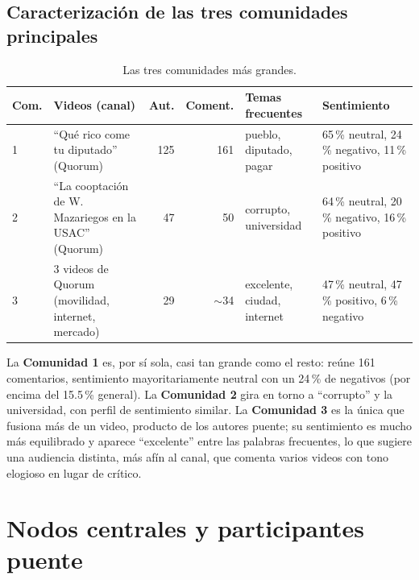 \documentclass[11pt,a4paper]{article}
\begin{document}
\subsection{Caracterizaci\'on de las tres comunidades principales}
\begin{table}[H]
\centering
\caption{Las tres comunidades m\'as grandes.}
\small
\begin{tabular}{l p{2.2cm} r r p{3.2cm} p{3.0cm}}
\toprule
Com. & Videos (canal) & Aut. & Coment. & Temas frecuentes & Sentimiento \\
\midrule
1 & ``Qu\'e rico come tu diputado'' (Quorum) & 125 & 161 &
  pueblo, diputado, pagar & 65\,\% neutral, 24\,\% negativo, 11\,\% positivo \\
2 & ``La cooptaci\'on de W. Mazariegos en la USAC'' (Quorum) & 47 & 50 &
  corrupto, universidad & 64\,\% neutral, 20\,\% negativo, 16\,\% positivo \\
3 & 3 videos de Quorum (movilidad, internet, mercado) & 29 & $\sim$34 &
  excelente, ciudad, internet & 47\,\% neutral, 47\,\% positivo, 6\,\% negativo \\
\bottomrule
\end{tabular}
\end{table}

La \textbf{Comunidad 1} es, por s\'i sola, casi tan grande como el resto: re\'une 161 comentarios,
sentimiento mayoritariamente neutral con un 24\,\% de negativos (por encima del 15.5\,\% general).
La \textbf{Comunidad 2} gira en torno a ``corrupto'' y la universidad, con perfil de sentimiento
similar. La \textbf{Comunidad 3} es la \'unica que fusiona m\'as de un video, producto de los autores
puente; su sentimiento es mucho m\'as equilibrado y aparece ``excelente'' entre las palabras
frecuentes, lo que sugiere una audiencia distinta, m\'as af\'in al canal, que comenta varios videos
con tono elogioso en lugar de cr\'itico.

\section{Nodos centrales y participantes puente}
\end{document}
